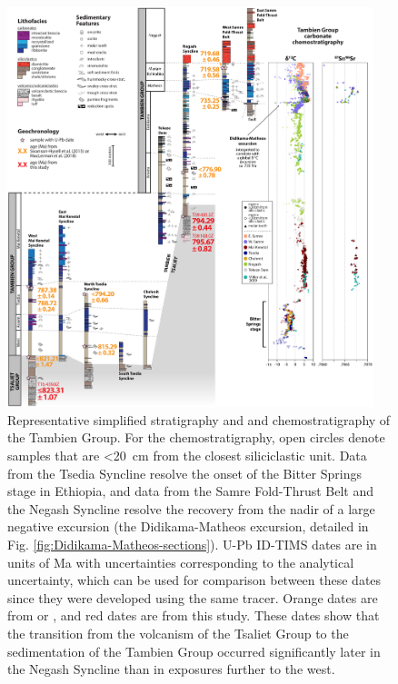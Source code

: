 \begin{figure}[!htbp]
\begin{center}
	\includegraphics[width=0.95\textwidth]{figures/Tambien/fence-diagram.pdf}
	\caption[Stratigraphy and \dC and \SrSr chemostratigraphy of the Tambien Group.]{Representative simplified stratigraphy and \dC and \SrSr chemostratigraphy of the Tambien Group. For the \dC chemostratigraphy, open circles denote samples that are \textless20~cm from the closest siliciclastic unit. Data from the Tsedia Syncline resolve the onset of the Bitter Springs stage in Ethiopia, and data from the Samre Fold-Thrust Belt and the Negash Syncline resolve the recovery from the nadir of a large negative \dC excursion (the Didikama-Matheos excursion, detailed in Fig. \ref{fig:Didikama-Matheos-sections}). U-Pb ID-TIMS dates are in units of Ma with uncertainties corresponding to the analytical uncertainty, which can be used for comparison between these dates since they were developed using the same tracer. Orange dates are from \citet{Swanson-Hysell2015a} or \citet{MacLennan2018a}, and red dates are from this study. These dates show that the transition from the volcanism of the Tsaliet Group to the sedimentation of the Tambien Group occurred significantly later in the Negash Syncline than in exposures further to the west.}
	\label{fig:fence-diagram}
\end{center}
\end{figure}


